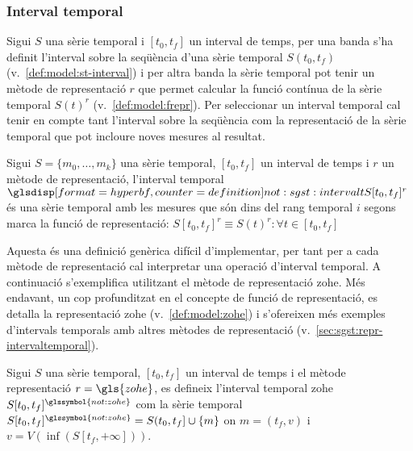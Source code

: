 \subsubsection{Interval temporal}

Sigui $S$ una sèrie temporal i $[t_0,t_f]$ un interval de temps, per
una banda s'ha definit l'interval sobre la seqüència d'una sèrie
temporal $S(t_0,t_f)$ (v.\ \autoref{def:model:st-interval}) i per
altra banda la sèrie temporal pot tenir un mètode de representació $r$
que permet calcular la funció contínua de la sèrie temporal $S(t)^r$
(v.\ \autoref{def:model:frepr}).  Per seleccionar un interval temporal
cal tenir en compte tant l'interval sobre la seqüència com la
representació de la sèrie temporal que pot incloure noves mesures al
resultat.

\begin{definition}
  \label{def:sgst:intervalt}
  Sigui $S=\{m_0, \ldots, m_k\}$ una sèrie temporal, $[t_0,t_f]$ un
  interval de temps i $r$ un mètode de representació, l'interval
  temporal $\glsdispdef{not:sgst:intervalt}{S[t_0,t_f]^r}$ és una
  sèrie temporal amb les mesures que són dins del rang temporal $i$
  segons marca la funció de representació: $S[t_0,t_f]^r\equiv S(t)^r:
  \forall t \in [t_0,t_f]$
\end{definition}

Aquesta és una definició genèrica difícil d'implementar, per tant per
a cada mètode de representació cal interpretar una operació d'interval
temporal.  A continuació s'exemplifica utilitzant el mètode de
representació \gls{zohe}. Més endavant, un cop profunditzat en el
concepte de funció de representació, es detalla la representació
\gls{zohe} (v.\ \autoref{def:model:zohe}) i s'ofereixen més exemples
d'intervals temporals amb altres mètodes de representació (v.\
\autoref{sec:sgst:repr-intervaltemporal}).
\begin{definition}
  \label{def:sgst:interval-temporal-zohe}
  Sigui $S$ una sèrie temporal, $[t_0,t_f]$ un interval de temps i el
  mètode representació $r=\gls{zohe}$, es defineix l'interval temporal
  \gls{zohe} $S[t_0,t_f]^{\glssymbol{not:zohe}}$ com la sèrie temporal
    $S[t_0,t_f]^{\glssymbol{not:zohe}} = S(t_0,t_f] \cup \{m\}$ on $m=(t_f,v)$
    i $v= V(\inf( S[t_f,+\infty] ))$.
\end{definition}



